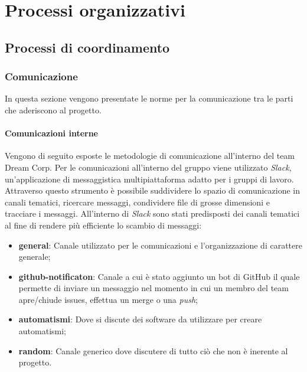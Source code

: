 \section{Processi organizzativi}
    \subsection{Processi di coordinamento}
        \subsubsection{Comunicazione}
            In questa sezione vengono presentate le norme per la comunicazione tra le parti che aderiscono al progetto.
            \paragraph{Comunicazioni interne}
                Vengono di seguito esposte le metodologie di comunicazione all'interno del team Dream Corp.
                \newline
                Per le comunicazioni all'interno del gruppo viene utilizzato \textit{Slack}\pedice, un'applicazione di messaggistica multipiattaforma adatto per i gruppi di lavoro. Attraverso questo strumento è possibile suddividere lo spazio di comunicazione in canali tematici, ricercare messaggi, condividere file di grosse dimensioni e tracciare i messaggi.
                \newline
                All'interno di \textit{Slack} sono stati predisposti dei canali tematici al fine di rendere più efficiente lo scambio di messaggi:
                \begin{itemize}
                    \item \textbf{general}: Canale utilizzato per le comunicazioni e l'organizzazione di carattere generale;
                    \item \textbf{github-notificaton}: Canale a cui è stato aggiunto un bot di GitHub il quale permette di inviare un messaggio nel momento in cui un membro del team apre/chiude issues, effettua un merge o una \textit{push};
                    \item \textbf{automatismi}: Dove si discute dei software da utilizzare per creare automatismi;
                    \item \textbf{random}: Canale generico dove discutere di tutto ciò che non è inerente al progetto.    
                \end{itemize}
                
